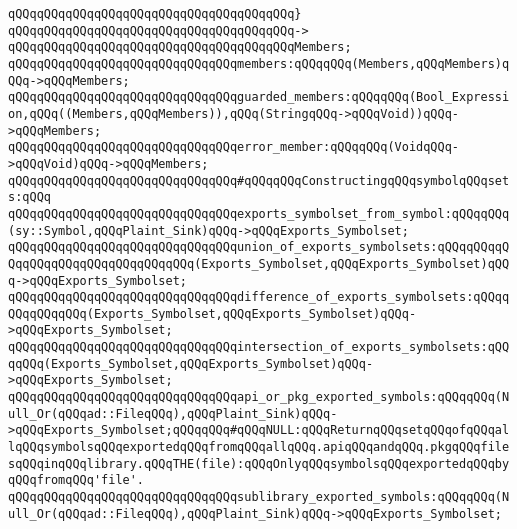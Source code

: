 \verb|qQQqqQQqqQQqqQQqqQQqqQQqqQQqqQQqqQQqqQQq}|\newline
\verb|qQQqqQQqqQQqqQQqqQQqqQQqqQQqqQQqqQQqqQQq->|\newline
\verb|qQQqqQQqqQQqqQQqqQQqqQQqqQQqqQQqqQQqqQQqMembers;|\newline
\newline
\verb|qQQqqQQqqQQqqQQqqQQqqQQqqQQqqQQqmembers:qQQqqQQq(Members,qQQqMembers)qQQq->qQQqMembers;|\newline
\newline
\verb|qQQqqQQqqQQqqQQqqQQqqQQqqQQqqQQqguarded_members:qQQqqQQq(Bool_Expression,qQQq((Members,qQQqMembers)),qQQq(StringqQQq->qQQqVoid))qQQq->qQQqMembers;|\newline
\newline
\verb|qQQqqQQqqQQqqQQqqQQqqQQqqQQqqQQqerror_member:qQQqqQQq(VoidqQQq->qQQqVoid)qQQq->qQQqMembers;|\newline
\newline
\verb|qQQqqQQqqQQqqQQqqQQqqQQqqQQqqQQq#qQQqqQQqConstructingqQQqsymbolqQQqsets:qQQq|\newline
\newline
\verb|qQQqqQQqqQQqqQQqqQQqqQQqqQQqqQQqexports_symbolset_from_symbol:qQQqqQQq(sy::Symbol,qQQqPlaint_Sink)qQQq->qQQqExports_Symbolset;|\newline
\newline
\verb|qQQqqQQqqQQqqQQqqQQqqQQqqQQqqQQqunion_of_exports_symbolsets:qQQqqQQqqQQqqQQqqQQqqQQqqQQqqQQqqQQq(Exports_Symbolset,qQQqExports_Symbolset)qQQq->qQQqExports_Symbolset;|\newline
\verb|qQQqqQQqqQQqqQQqqQQqqQQqqQQqqQQqdifference_of_exports_symbolsets:qQQqqQQqqQQqqQQq(Exports_Symbolset,qQQqExports_Symbolset)qQQq->qQQqExports_Symbolset;|\newline
\verb|qQQqqQQqqQQqqQQqqQQqqQQqqQQqqQQqintersection_of_exports_symbolsets:qQQqqQQq(Exports_Symbolset,qQQqExports_Symbolset)qQQq->qQQqExports_Symbolset;|\newline
\newline
\newline
\verb|qQQqqQQqqQQqqQQqqQQqqQQqqQQqqQQqapi_or_pkg_exported_symbols:qQQqqQQq(Null_Or(qQQqad::FileqQQq),qQQqPlaint_Sink)qQQq->qQQqExports_Symbolset;qQQqqQQq#qQQqNULL:qQQqReturnqQQqsetqQQqofqQQqallqQQqsymbolsqQQqexportedqQQqfromqQQqallqQQq.apiqQQqandqQQq.pkgqQQqfilesqQQqinqQQqlibrary.qQQqTHE(file):qQQqOnlyqQQqsymbolsqQQqexportedqQQqbyqQQqfromqQQq'file'.|\newline
\verb|qQQqqQQqqQQqqQQqqQQqqQQqqQQqqQQqsublibrary_exported_symbols:qQQqqQQq(Null_Or(qQQqad::FileqQQq),qQQqPlaint_Sink)qQQq->qQQqExports_Symbolset;|\newline
